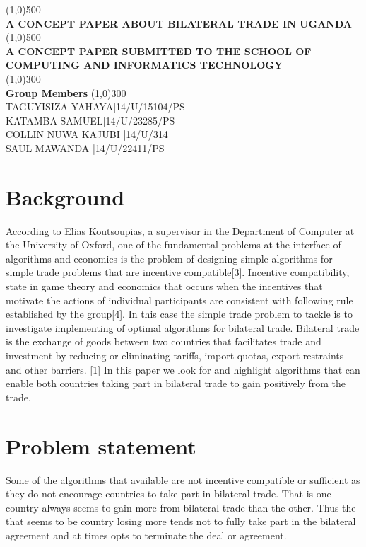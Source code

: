 \documentclass[12pt,a4paper]{article}
\begin{document}
\begin{titlepage}
    \begin{center}
\line(1,0){500}\\
\huge{\bfseries A CONCEPT PAPER ABOUT BILATERAL TRADE IN UGANDA\\}
\line(1,0){500}\\
[0.25in]
\huge{\bfseries A CONCEPT PAPER SUBMITTED TO THE SCHOOL OF COMPUTING AND INFORMATICS TECHNOLOGY}\\
[1.5in]
\line(1,0){300}\\
\huge{\bfseries Group Members}
\line(1,0){300}\\
TAGUYISIZA YAHAYA|14/U/15104/PS\\
KATAMBA SAMUEL|14/U/23285/PS\\
COLLIN NUWA KAJUBI |14/U/314\\
SAUL MAWANDA |14/U/22411/PS\\
\end{center}
\end{titlepage}
\author{GROUP 122}
\section{Background}
According to Elias Koutsoupias, a supervisor in the Department of Computer at the University of Oxford, one of the fundamental problems at the interface of algorithms and economics is the problem of designing simple algorithms for simple trade problems that are incentive compatible[3]. Incentive compatibility, state in game theory and economics that occurs when the incentives that motivate the actions of individual participants are consistent with following rule established by the group[4]. In this case the simple trade problem to tackle is to investigate implementing of optimal algorithms for bilateral trade. Bilateral trade is the exchange of goods between two countries that facilitates trade and investment by reducing or eliminating tariffs, import quotas, export restraints and other barriers. [1] In this paper we look for and highlight algorithms that can enable both countries taking part in bilateral trade to gain positively from the trade.
\section{Problem statement}
Some of the algorithms that available are not incentive compatible or sufficient as they do not encourage countries to take part in bilateral trade. That is one country always seems to gain more from bilateral trade than the other. Thus the that seems to be country losing more tends not to fully take part in the bilateral agreement and at times opts to terminate the deal or agreement.
\end{document}
